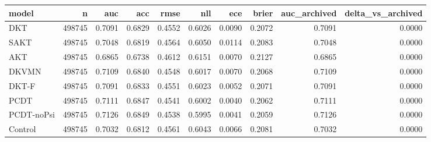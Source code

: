 \begin{tabular}{lrrrrrrrrr}
\toprule
model & n & auc & acc & rmse & nll & ece & brier & auc\_archived & delta\_vs\_archived \\
\midrule
DKT & 498745 & 0.7091 & 0.6829 & 0.4552 & 0.6026 & 0.0090 & 0.2072 & 0.7091 & 0.0000 \\
SAKT & 498745 & 0.7048 & 0.6819 & 0.4564 & 0.6050 & 0.0114 & 0.2083 & 0.7048 & 0.0000 \\
AKT & 498745 & 0.6865 & 0.6738 & 0.4612 & 0.6151 & 0.0070 & 0.2127 & 0.6865 & 0.0000 \\
DKVMN & 498745 & 0.7109 & 0.6840 & 0.4548 & 0.6017 & 0.0070 & 0.2068 & 0.7109 & 0.0000 \\
DKT-F & 498745 & 0.7091 & 0.6833 & 0.4551 & 0.6023 & 0.0052 & 0.2071 & 0.7091 & 0.0000 \\
PCDT & 498745 & 0.7111 & 0.6847 & 0.4541 & 0.6002 & 0.0040 & 0.2062 & 0.7111 & 0.0000 \\
PCDT-noPsi & 498745 & 0.7126 & 0.6849 & 0.4538 & 0.5995 & 0.0041 & 0.2059 & 0.7126 & 0.0000 \\
Control & 498745 & 0.7032 & 0.6812 & 0.4561 & 0.6043 & 0.0066 & 0.2081 & 0.7032 & 0.0000 \\
\bottomrule
\end{tabular}
